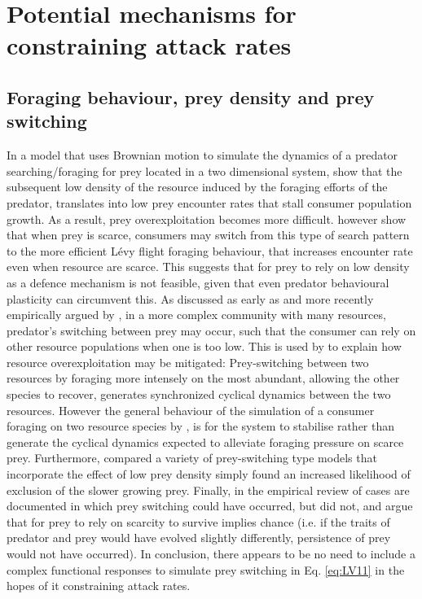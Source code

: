 \documentclass[a4paper]{report}
\begin{document}
\section{Potential mechanisms for constraining attack rates}

\subsection{Foraging behaviour, prey density and prey switching \label{sec:forage}} In a model that uses Brownian motion to simulate the dynamics of a predator searching/foraging for prey located in a two dimensional system, \citep{Basset1997} show that the subsequent low density of the resource induced by the foraging efforts of the predator, translates into low prey encounter rates that stall consumer population growth. As a result, prey overexploitation becomes more difficult. \citep{Humphries2010} however show that when prey is scarce, consumers may switch from this type of search pattern to the more efficient Lévy flight foraging behaviour, that increases encounter rate even when resource are scarce. This suggests that for prey to rely on low density as a defence mechanism is not feasible, given that even predator behavioural plasticity can circumvent this. As discussed as early as \citep{Holling1961} and more recently empirically argued by \citep{Jaworski2013}, in a more complex community with many resources, predator’s switching between prey may occur, such that the consumer can rely on other resource populations when one is too low. This is used by \citep{Murdoch1975} to explain how resource overexploitation may be mitigated: Prey-switching between two resources by foraging more intensely on the most abundant, allowing the other species to recover, generates synchronized cyclical dynamics between the two resources. However the general behaviour of the simulation of a consumer foraging on two resource species by \citep{Tanksy1978}, is for the system to stabilise rather than generate the cyclical dynamics expected to alleviate foraging pressure on scarce prey. Furthermore, \citep{Abrams2003} compared a variety of prey-switching type models that incorporate the effect of low prey density simply found an increased likelihood of exclusion of the slower growing prey. Finally, in the empirical review of \citep{MAtter2005} cases are documented in which prey switching could have occurred, but did not, and argue that for prey to rely on scarcity to survive implies chance (i.e. if the traits of predator and prey would have evolved slightly differently, persistence of prey would not have occurred). In conclusion, there appears to be no need to include a complex functional responses to simulate prey switching in Eq. \eqref{eq:LV11} in the hopes of it constraining attack rates. \\
\end{document}
